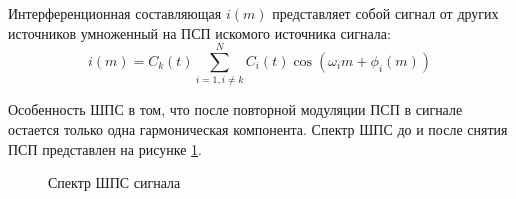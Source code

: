Интерференционная составляющая ${i(m)}$ представляет собой сигнал от других источников умноженный на ПСП искомого источника сигнала:
\begin{equation}
	\label{eq:cdma_interference}
	i(m) = C_k(t) \sum\limits_{i=1, i \ne k}^{N}C_i(t)\cos{(\omega_{i}m + \phi_i(m))}
\end{equation}

Особенность ШПС в том, что после повторной модуляции ПСП в сигнале остается только одна гармоническая компонента.
Спектр ШПС до и после снятия ПСП представлен на рисунке \ref{pic:gps_spectrum}.

\begin{figure}[H]
	\center{}
	\caption{Спектр ШПС сигнала}
	\label{pic:gps_spectrum}
\end{figure}
